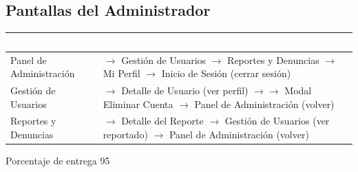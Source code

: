\documentclass[12pt,a4paper]{article}
\begin{document}
\subsection{Pantallas del Administrador}
\begin{longtable}{|p{5cm}|p{9cm}|}
\hline
\rowcolor{darkbg}\textcolor{white}{\textbf{Pantalla Origen}} & \textcolor{white}{\textbf{Puede ir a}} \\
\hline
Panel de Administración & $\rightarrow$ Gestión de Usuarios \newline $\rightarrow$ Reportes y Denuncias \newline $\rightarrow$ Mi Perfil \newline $\rightarrow$ Inicio de Sesión (cerrar sesión) \\
\hline
Gestión de Usuarios & $\rightarrow$ Detalle de Usuario (ver perfil) \newline $\rightarrow$$\rightarrow$ Modal Eliminar Cuenta \newline $\rightarrow$ Panel de Administración (volver) \\
\hline
Reportes y Denuncias & $\rightarrow$ Detalle del Reporte \newline $\rightarrow$ Gestión de Usuarios (ver reportado) \newline $\rightarrow$ Panel de Administración (volver) \\
\hline
\end{longtable}

Porcentaje de entrega 95%
\end{document}

